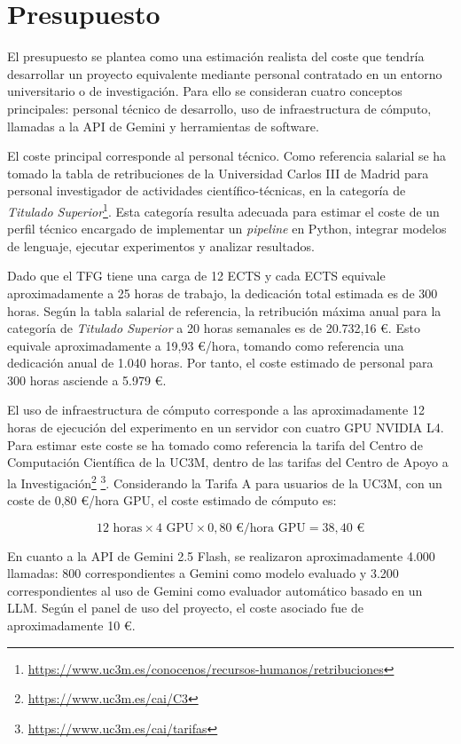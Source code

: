 \documentclass[12pt]{report} %
\renewcommand{\_}{\oldunderscore\allowbreak}
\begin{document}
\section{Presupuesto}

El presupuesto se plantea como una estimación realista del coste que tendría desarrollar un proyecto equivalente mediante personal contratado en un entorno universitario o de investigación. Para ello se consideran cuatro conceptos principales: personal técnico de desarrollo, uso de infraestructura de cómputo, llamadas a la API de Gemini y herramientas de software.

El coste principal corresponde al personal técnico. Como referencia salarial se ha tomado la tabla de retribuciones de la Universidad Carlos III de Madrid para personal investigador de actividades científico-técnicas, en la categoría de \textit{Titulado Superior}\footnote{\url{https://www.uc3m.es/conocenos/recursos-humanos/retribuciones}}. Esta categoría resulta adecuada para estimar el coste de un perfil técnico encargado de implementar un \textit{pipeline} en Python, integrar modelos de lenguaje, ejecutar experimentos y analizar resultados.

Dado que el TFG tiene una carga de 12 ECTS y cada ECTS equivale aproximadamente a 25 horas de trabajo, la dedicación total estimada es de 300 horas. Según la tabla salarial de referencia, la retribución máxima anual para la categoría de \textit{Titulado Superior} a 20 horas semanales es de 20.732,16 €. Esto equivale aproximadamente a 19,93 €/hora, tomando como referencia una dedicación anual de 1.040 horas. Por tanto, el coste estimado de personal para 300 horas asciende a 5.979 €.

El uso de infraestructura de cómputo corresponde a las aproximadamente 12 horas de ejecución del experimento en un servidor con cuatro GPU NVIDIA L4. Para estimar este coste se ha tomado como referencia la tarifa del Centro de Computación Científica de la UC3M, dentro de las tarifas del Centro de Apoyo a la Investigación\footnote{\url{https://www.uc3m.es/cai/C3}} \footnote{\url{https://www.uc3m.es/cai/tarifas}}. Considerando la Tarifa A para usuarios de la UC3M, con un coste de 0,80 €/hora GPU, el coste estimado de cómputo es:

\[
12 \text{ horas} \times 4 \text{ GPU} \times 0{,}80 \text{ €/hora GPU} = 38{,}40 \text{ €}
\]

En cuanto a la API de Gemini 2.5 Flash, se realizaron aproximadamente 4.000 llamadas: 800 correspondientes a Gemini como modelo evaluado y 3.200 correspondientes al uso de Gemini como evaluador automático basado en un LLM. Según el panel de uso del proyecto, el coste asociado fue de aproximadamente 10 €.
\end{document}
